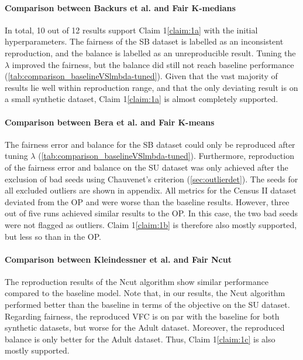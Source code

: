 \paragraph{Comparison between Backurs et al. and Fair $\mathbf{K}$-medians} In total,
10 out of 12 results support Claim 1\ref{claim:1a} with the initial hyperparameters. The fairness of the SB dataset is labelled as an inconsistent reproduction, and the balance is labelled as an unreproducible result. Tuning the $\lambda$ improved the fairness, but the balance did still not reach baseline performance (\autoref{tab:comparison_baselineVSlmbda-tuned}). Given that the vast majority of results lie well within reproduction range, and that the only deviating result is on a small synthetic dataset, Claim 1\ref{claim:1a} is almost completely supported. 

\paragraph{Comparison between Bera et al. and Fair $\mathbf{K}$-means}\label{ssec:comparisonkmeans} The fairness error and balance for the SB dataset could only be reproduced after tuning $\lambda$ (\autoref{tab:comparison_baselineVSlmbda-tuned}). Furthermore, reproduction of the fairness error and balance on the SU dataset was only achieved after the exclusion of bad seeds using Chauvenet's criterion (\autoref{sec:outlierdet}). The seeds for all excluded outliers are shown in appendix.
All metrics for the Census II dataset deviated from the OP and were worse than the baseline results. However, three out of five runs achieved similar results to the OP. In this case, the two bad seeds were not flagged as outliers.
Claim 1\ref{claim:1b} is therefore also mostly supported, but less so than in the OP.

\paragraph{Comparison between Kleindessner et al. and Fair Ncut} 
The reproduction results of the Ncut algorithm show similar performance compared to the baseline model. Note that, in our results, the Ncut algorithm performed better than the baseline in terms of the objective on the SU dataset. Regarding fairness, the reproduced VFC is on par with the baseline for both synthetic datasets, but worse for the Adult dataset. Moreover, the reproduced balance is only better for the Adult dataset. Thus, Claim 1\ref{claim:1c} is also mostly supported.

